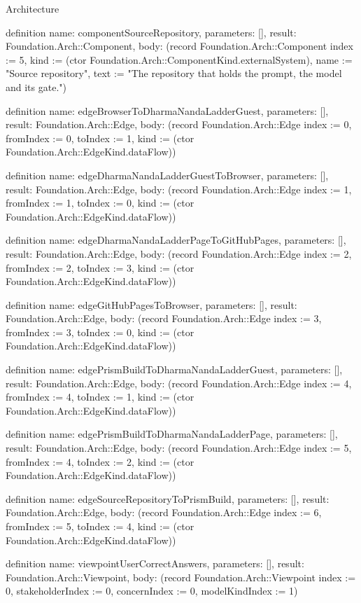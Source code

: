 \begin{lexlean}{Architecture}
\begin{semanticmodule}
definition{
  name: componentSourceRepository,
  parameters: [],
  result: Foundation.Arch::Component,
  body: (record Foundation.Arch::Component {index := 5, kind := (ctor Foundation.Arch::ComponentKind.externalSystem), name := "Source repository", text := "The repository that holds the prompt, the model and its gate."})
}

definition{
  name: edgeBrowserToDharmaNandaLadderGuest,
  parameters: [],
  result: Foundation.Arch::Edge,
  body: (record Foundation.Arch::Edge {index := 0, fromIndex := 0, toIndex := 1, kind := (ctor Foundation.Arch::EdgeKind.dataFlow)})
}

definition{
  name: edgeDharmaNandaLadderGuestToBrowser,
  parameters: [],
  result: Foundation.Arch::Edge,
  body: (record Foundation.Arch::Edge {index := 1, fromIndex := 1, toIndex := 0, kind := (ctor Foundation.Arch::EdgeKind.dataFlow)})
}

definition{
  name: edgeDharmaNandaLadderPageToGitHubPages,
  parameters: [],
  result: Foundation.Arch::Edge,
  body: (record Foundation.Arch::Edge {index := 2, fromIndex := 2, toIndex := 3, kind := (ctor Foundation.Arch::EdgeKind.dataFlow)})
}

definition{
  name: edgeGitHubPagesToBrowser,
  parameters: [],
  result: Foundation.Arch::Edge,
  body: (record Foundation.Arch::Edge {index := 3, fromIndex := 3, toIndex := 0, kind := (ctor Foundation.Arch::EdgeKind.dataFlow)})
}

definition{
  name: edgePrismBuildToDharmaNandaLadderGuest,
  parameters: [],
  result: Foundation.Arch::Edge,
  body: (record Foundation.Arch::Edge {index := 4, fromIndex := 4, toIndex := 1, kind := (ctor Foundation.Arch::EdgeKind.dataFlow)})
}

definition{
  name: edgePrismBuildToDharmaNandaLadderPage,
  parameters: [],
  result: Foundation.Arch::Edge,
  body: (record Foundation.Arch::Edge {index := 5, fromIndex := 4, toIndex := 2, kind := (ctor Foundation.Arch::EdgeKind.dataFlow)})
}

definition{
  name: edgeSourceRepositoryToPrismBuild,
  parameters: [],
  result: Foundation.Arch::Edge,
  body: (record Foundation.Arch::Edge {index := 6, fromIndex := 5, toIndex := 4, kind := (ctor Foundation.Arch::EdgeKind.dataFlow)})
}

definition{
  name: viewpointUserCorrectAnswers,
  parameters: [],
  result: Foundation.Arch::Viewpoint,
  body: (record Foundation.Arch::Viewpoint {index := 0, stakeholderIndex := 0, concernIndex := 0, modelKindIndex := 1})
}


\end{semanticmodule}
\end{lexlean}
